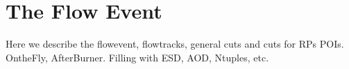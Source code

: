 \chapter{The Flow Event}
\label{flowevent}
Here we describe the flowevent, flowtracks, general cuts and cuts for RPs POIs.
OntheFly, AfterBurner. Filling with ESD, AOD, Ntuples, etc.  
